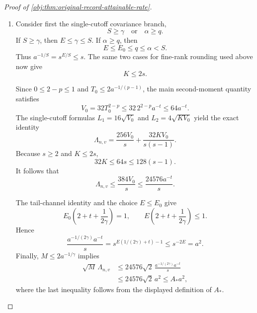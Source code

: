 \documentclass[11pt]{article}
\begin{document}
\begin{proof}[Proof of \cref{obj:thm:original-record-attainable-rate}]
\begin{enumerate}
Using \(a_j=40R_{j-1}^{-\alpha}\), \(R_j=2R_{j-1}\), and \(2^\alpha\le2\), we obtain
\[
\begin{aligned}
a_jT_j^{1-p}
&\le40aR_{j-1}^{-\alpha}
 +40a\,2^\alpha(R_j/K)^{\lambda_0}\\
&\le80a\left\{R_{j-1}^{-\alpha}+(R_j/K)^{\lambda_0}\right\}.
\end{aligned}
\]
Summation consequently gives
\[
\sum_{j=1}^{L}a_jT_j^{1-p}
\le80a\{A(\alpha)+A(\lambda_0)\}.
\]
Substituting into the multilevel bias ledger proves
\[
\begin{aligned}
B
&=400K^{-S}+20T_0^{1-p}
  +10\sum_{j=1}^{L}a_jT_j^{1-p}\\
&\le\left[420+800\{A(\alpha)+A(\lambda_0)\}\right]a
=B_*a.
\end{aligned}
\]
Thus this bias estimate holds in both score branches.

\item Consider first the single-cutoff covariance branch,
\[
S\ge\gamma\quad\text{or}\quad\alpha\ge q.
\]
If \(S\ge\gamma\), then \(E\le\gamma\le S\). If \(\alpha\ge q\), then
\[
E\le E_0\le q\le\alpha<S.
\]
Thus \(a^{-1/S}=s^{E/S}\le s\). The same two cases for fine-rank rounding used above now give
\[
K\le2s.
\]

Since \(0\le2-p\le1\) and \(T_0\le2a^{-1/(p-1)}\), the main second-moment quantity satisfies
\[
V_0=32T_0^{2-p}
\le32\,2^{2-p}a^{-t}
\le64a^{-t}.
\]
The single-cutoff formulas \(L_1=16\sqrt{V_0}\) and \(L_2=4\sqrt{KV_0}\) yield the exact identity
\[
\Lambda_{n,v}
=\frac{256V_0}{s}+\frac{32KV_0}{s(s-1)}.
\]
Because \(s\ge2\) and \(K\le2s\),
\[
32K\le64s\le128(s-1).
\]
It follows that
\[
\Lambda_{n,v}
\le\frac{384V_0}{s}
\le\frac{24576a^{-t}}{s}.
\]

The tail-channel identity and the choice \(E\le E_0\) give
\[
E_0\left(2+t+\frac{1}{2\gamma}\right)=1,
\qquad
E\left(2+t+\frac{1}{2\gamma}\right)\le1.
\]
Hence
\[
\frac{a^{-1/(2\gamma)}a^{-t}}{s}
=s^{E(1/(2\gamma)+t)-1}
\le s^{-2E}=a^2.
\]
Finally, \(M\le2a^{-1/\gamma}\) implies
\[
\begin{aligned}
\sqrt M\,\Lambda_{n,v}
&\le24576\sqrt2\,
 \frac{a^{-1/(2\gamma)}a^{-t}}{s}\\
&\le24576\sqrt2\,a^2
\le A_*a^2,
\end{aligned}
\]
where the last inequality follows from the displayed definition of \(A_*\).


\end{enumerate}
\end{proof}
\end{document}
